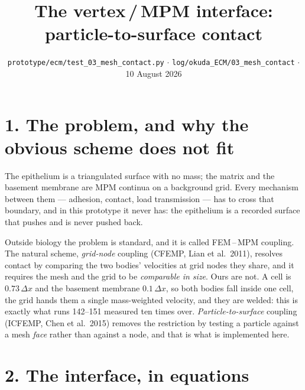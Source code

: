 \documentclass[10pt,a4paper]{article}
\title{\vspace{-1.4cm}\textbf{The vertex\,/\,MPM interface: particle-to-surface contact}}
\author{}
\date{\vspace{-0.9cm}\small \texttt{prototype/ecm/test\_03\_mesh\_contact.py} $\cdot$
\texttt{log/okuda\_ECM/03\_mesh\_contact} $\cdot$ 10 August 2026}
\begin{document}
\maketitle\vspace{-1.0cm}

\section*{1.\; The problem, and why the obvious scheme does not fit}

The epithelium is a triangulated surface with no mass; the matrix and the basement membrane are MPM
continua on a background grid. Every mechanism between them --- adhesion, contact, load transmission ---
has to cross that boundary, and in this prototype it never has: the epithelium is a recorded surface
that pushes and is never pushed back.

Outside biology the problem is standard, and it is called FEM\,--\,MPM coupling. The natural scheme,
\emph{grid-node} coupling (CFEMP, Lian et al.\ 2011), resolves contact by comparing the two bodies'
velocities at grid nodes they share, and it requires the mesh and the grid to be \emph{comparable in
size}. Ours are not. A cell is $0.73\,\Delta x$ and the basement membrane $0.1\,\Delta x$, so both
bodies fall inside one cell, the grid hands them a single mass-weighted velocity, and they are welded:
this is exactly what runs 142--151 measured ten times over. \emph{Particle-to-surface} coupling
(ICFEMP, Chen et al.\ 2015) removes the restriction by testing a particle against a mesh \emph{face}
rather than against a node, and that is what is implemented here.

\section*{2.\; The interface, in equations}
\end{document}
